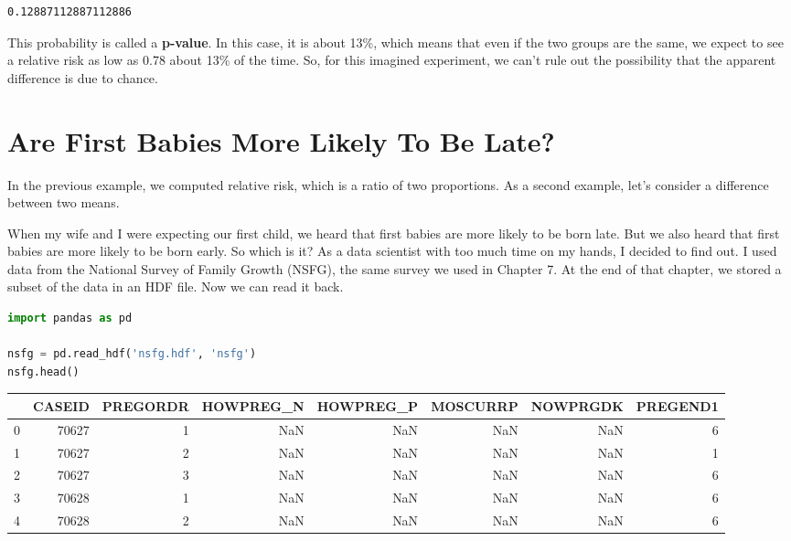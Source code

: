\begin{lstlisting}[style=output]
0.12887112887112886
\end{lstlisting}

This probability is called a \textbf{p-value}. In this case, it is about
13\%, which means that even if the two groups are the same, we expect to
see a relative risk as low as 0.78 about 13\% of the time. So, for this
imagined experiment, we can't rule out the possibility that the apparent
difference is due to chance.

\section{Are First Babies More Likely To Be
Late?}\label{are-first-babies-more-likely-to-be-late}

In the previous example, we computed relative risk, which is a ratio of
two proportions. As a second example, let's consider a difference
between two means.

When my wife and I were expecting our first child, we heard that first
babies are more likely to be born late. But we also heard that first
babies are more likely to be born early. So which is it? As a data
scientist with too much time on my hands, I decided to find out. I used
data from the National Survey of Family Growth (NSFG), the same survey
we used in Chapter 7. At the end of that chapter, we stored a subset of
the data in an HDF file. Now we can read it back.

\begin{lstlisting}[language=Python,style=source]
import pandas as pd

nsfg = pd.read_hdf('nsfg.hdf', 'nsfg')
nsfg.head()
\end{lstlisting}



\begin{tabular}{lrrrrrrr}
\midrule
 & CASEID & PREGORDR & HOWPREG\_N & HOWPREG\_P & MOSCURRP & NOWPRGDK & PREGEND1 \\
\midrule
0 & 70627 & 1 & NaN & NaN & NaN & NaN & 6 \\
1 & 70627 & 2 & NaN & NaN & NaN & NaN & 1 \\
2 & 70627 & 3 & NaN & NaN & NaN & NaN & 6 \\
3 & 70628 & 1 & NaN & NaN & NaN & NaN & 6 \\
4 & 70628 & 2 & NaN & NaN & NaN & NaN & 6 \\
\midrule
\end{tabular}

